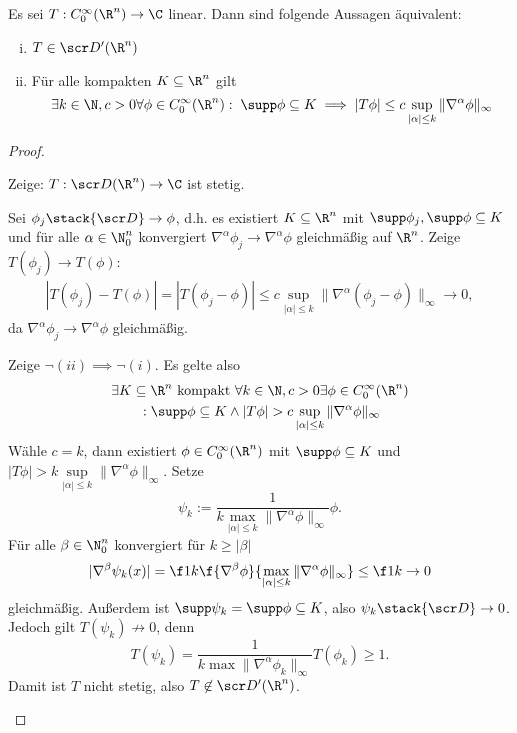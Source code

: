 \begin{st} \label{5.25}
	Es sei $T : C_0^\infty (\R^n) \to \C$ linear.
	Dann sind folgende Aussagen äquivalent:
	\begin{enumerate}[(i)]
		\item
			$T \in \scr D'(\R^n)$
		\item
			Für alle kompakten $K \subset \R^n$ gilt
			\[
				\exists k \in \N, c > 0 \forall \phi \in C_0^\infty(\R^n) : \;
				\supp \phi \subset K \implies |T\phi| \le c \sup_{|\alpha| \le k} \|\nabla^\alpha \phi\|_\infty
			\]
	\end{enumerate}
	\begin{proof}
		\begin{seg}[(ii)$\implies$(i)]
			Zeige: $T : \scr D(\R^n) \to \C$ ist stetig.

			Sei $\phi_j \stack {\scr D}\to \phi$, d.h. es existiert $K \subset \R^n$ mit $\supp \phi_j, \supp \phi \subset K$ und für alle $\alpha \in \N_0^n$ konvergiert $\nabla^\alpha \phi_j \to \nabla^\alpha \phi$ gleichmäßig auf $\R^n$.
			Zeige $T(\phi_j) \to T(\phi)$:
			\begin{align*}
				|T(\phi_j) - T(\phi)|
				= | T(\phi_j-\phi)|
				\le c \sup_{|\alpha| \le k} \| \nabla^\alpha (\phi_j - \phi) \|_\infty
				\to 0,
			\end{align*}
			da $\nabla^\alpha \phi_j \to \nabla^\alpha \phi$ gleichmäßig.
		\end{seg}
		\begin{seg}[(i)$\implies$ (ii)]
			Zeige $\lnot (ii) \implies \lnot (i)$.
			Es gelte also
			\begin{align*}
				&\exists K \subset \R^n \text{ kompakt } \forall k \in \N,  c > 0 \exists \phi \in C_0^\infty(\R^n) \\
				& \qquad : \supp \phi \subset K \land |T\phi| > c \sup_{|\alpha|\le k} \|\nabla^\alpha \phi \|_\infty
			\end{align*}
			Wähle $c = k$, dann existiert $\phi \in C_0^\infty (\R^n)$ mit $\supp \phi \subset K$ und $|T \phi| > k \sup\limits_{|\alpha| \le k} \|\nabla^\alpha \phi\|_\infty$.
			Setze
			\[
				\psi_k := \dfrac 1{k \max\limits_{|\alpha| \le k}\| \nabla^\alpha \phi\|_\infty} \phi.
			\]
			Für alle $\beta \in \N_0^n$ konvergiert für $k \ge |\beta|$
			\[
				|\nabla^\beta \psi_k(x)|
				= \f 1k \f{\nabla^\beta \phi}{\max\limits_{|\alpha|\le k} \|\nabla^\alpha \phi\|_\infty}
				\le \f 1k
				\to 0
			\]
			gleichmäßig.
			Außerdem ist $\supp \psi_k = \supp \phi \subset K$, also $\psi_k \stack {\scr D}\to 0$.
			Jedoch gilt $T(\psi_k) \not\to 0$, denn
			\[
				T(\psi_k) = \dfrac 1{k \max\|\nabla^\alpha \phi_k\|_\infty} T(\phi_k) \ge 1.
			\]
			Damit ist $T$ nicht stetig, also $T \not\in \scr D'(\R^n)$.
		\end{seg}
	\end{proof}
\end{st}


